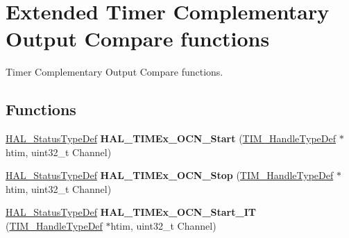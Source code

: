 \hypertarget{group___t_i_m_ex___exported___functions___group2}{}\section{Extended Timer Complementary Output Compare functions}
\label{group___t_i_m_ex___exported___functions___group2}


Timer Complementary Output Compare functions.  


\subsection*{Functions}
\begin{DoxyCompactItemize}
\item 
\mbox{\label{group___t_i_m_ex___exported___functions___group2_ga56d25f544564ef28a66dca7ec150de00}} 
\mbox{\hyperlink{stm32f7xx__hal__def_8h_a63c0679d1cb8b8c684fbb0632743478f}{H\+A\+L\+\_\+\+Status\+Type\+Def}} {\bfseries H\+A\+L\+\_\+\+T\+I\+M\+Ex\+\_\+\+O\+C\+N\+\_\+\+Start} (\mbox{\hyperlink{struct_t_i_m___handle_type_def}{T\+I\+M\+\_\+\+Handle\+Type\+Def}} $\ast$htim, uint32\+\_\+t Channel)
\item 
\mbox{\label{group___t_i_m_ex___exported___functions___group2_ga576cb1c3e40fc49555f232773cb2cdbc}} 
\mbox{\hyperlink{stm32f7xx__hal__def_8h_a63c0679d1cb8b8c684fbb0632743478f}{H\+A\+L\+\_\+\+Status\+Type\+Def}} {\bfseries H\+A\+L\+\_\+\+T\+I\+M\+Ex\+\_\+\+O\+C\+N\+\_\+\+Stop} (\mbox{\hyperlink{struct_t_i_m___handle_type_def}{T\+I\+M\+\_\+\+Handle\+Type\+Def}} $\ast$htim, uint32\+\_\+t Channel)
\item 
\mbox{\label{group___t_i_m_ex___exported___functions___group2_ga2f4d7c285095d5293b81d2e11cd991af}} 
\mbox{\hyperlink{stm32f7xx__hal__def_8h_a63c0679d1cb8b8c684fbb0632743478f}{H\+A\+L\+\_\+\+Status\+Type\+Def}} {\bfseries H\+A\+L\+\_\+\+T\+I\+M\+Ex\+\_\+\+O\+C\+N\+\_\+\+Start\+\_\+\+IT} (\mbox{\hyperlink{struct_t_i_m___handle_type_def}{T\+I\+M\+\_\+\+Handle\+Type\+Def}} $\ast$htim, uint32\+\_\+t Channel)
\item 
\mbox{\label{group___t_i_m_ex___exported___functions___group2_gabe91877781dbd7fb9fdd63262e6ea10f}} 

\end{DoxyCompactItemize}

